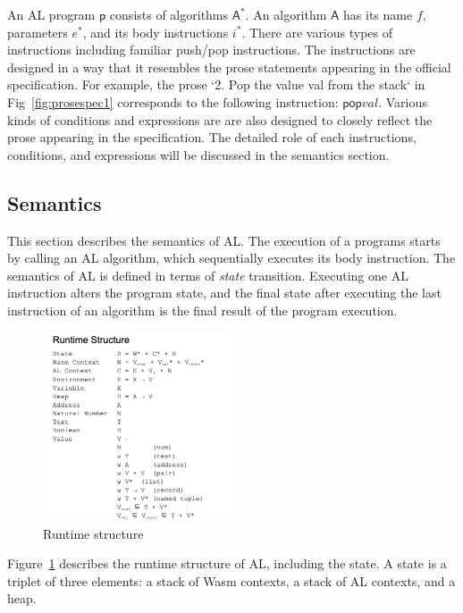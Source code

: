 An AL program $\mathsf{p}$ consists of algorithms $\mathsf{A}^\ast$.  An
algorithm $\mathsf{A}$ has its name $\mathit{f}$, parameters
${\mathit{e}^\ast}$, and its body instructions ${\mathit{i}^\ast}$.  There are
various types of instructions including familiar push/pop instructions. The
instructions are designed in a way that it resembles the prose statements
appearing in the official specification.  For example, the prose `2. Pop the
value val from the stack` in Fig~\ref{fig:prosespec1} corresponds to the following
instruction: $\mathsf{pop} \mathit{val}$. Various kinds of conditions and expressions are
are also designed to closely reflect the prose appearing in the specification.
The detailed role of each instructions, conditions, and expressions will be discussed
in the semantics section.

\subsection{Semantics}

This section describes the semantics of AL.
The execution of a programs starts by calling an AL algorithm,
which sequentially executes its body instruction.
The semantics of AL is defined in terms of \textit{state} transition.
Executing one AL instruction alters the program state,
and the final state after executing the last instruction of an algorithm is the
final result of the program execution. 

\begin{figure}
  \centering
  \includegraphics[width=0.5\textwidth]{img/runtime.png}
  \caption{Runtime structure}
  \label{fig:runtime}
\end{figure}

Figure~\ref{fig:runtime} describes the runtime structure of AL, including the state.
A state is a triplet of three elements: a stack of Wasm contexts, a stack of AL contexts, and a heap.

